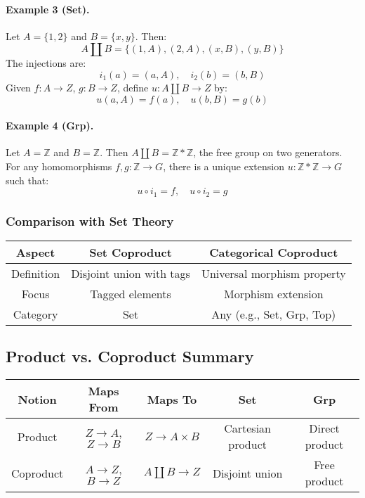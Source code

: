 \documentclass[10pt]{article}
\theoremstyle{plain}
\theoremstyle{definition}
\begin{document}
  \paragraph{Example 3 (Set).}
  Let $A = \{1, 2\}$ and $B = \{x, y\}$. Then:
  \[
  A \amalg B = \{(1,A), (2,A), (x,B), (y,B)\}
  \]
  The injections are:
  \[
  i_1(a) = (a, A),\quad i_2(b) = (b, B)
  \]
  Given $f : A \to Z$, $g : B \to Z$, define $u : A \amalg B \to Z$ by:
  \[
  u(a, A) = f(a),\quad u(b, B) = g(b)
  \]
  
  \paragraph{Example 4 (Grp).}
  Let $A = \mathbb{Z}$ and $B = \mathbb{Z}$. Then $A \amalg B = \mathbb{Z} * \mathbb{Z}$, the free group on two generators. For any homomorphisms $f, g : \mathbb{Z} \to G$, there is a unique extension $u : \mathbb{Z} * \mathbb{Z} \to G$ such that:
  \[
  u \circ i_1 = f,\quad u \circ i_2 = g
  \]
  
  \subsubsection*{Comparison with Set Theory}
  \begin{center}
  	\begin{tabular}{|c|c|c|}
  		\hline
  		\textbf{Aspect} & \textbf{Set Coproduct} & \textbf{Categorical Coproduct} \\
  		\hline
  		Definition & Disjoint union with tags & Universal morphism property \\
  		\hline
  		Focus & Tagged elements & Morphism extension \\
  		\hline
  		Category & Set & Any (e.g., Set, Grp, Top) \\
  		\hline
  	\end{tabular}
  \end{center}
  
  \subsection*{Product vs. Coproduct Summary}
  
  \begin{center}
  	\begin{tabular}{|c|c|c|c|c|}
  		\hline
  		\textbf{Notion} & \textbf{Maps From} & \textbf{Maps To} & \textbf{Set} & \textbf{Grp} \\
  		\hline
  		Product & $Z \to A$, $Z \to B$ & $Z \to A \times B$ & Cartesian product & Direct product \\
  		\hline
  		Coproduct & $A \to Z$, $B \to Z$ & $A \amalg B \to Z$ & Disjoint union & Free product \\
  		\hline
  	\end{tabular}
  \end{center}
  
\end{document}
